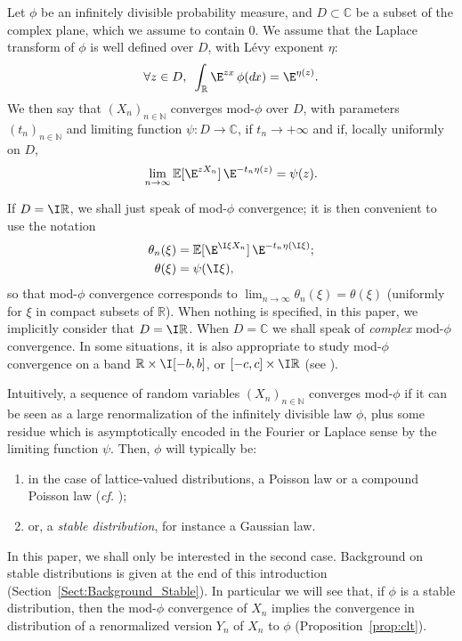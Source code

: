 \documentclass[envcountsame]{svmult}
\newcommand{\N}{\mathbb{N}}
\newcommand{\R}{\mathbb{R}}
\newcommand{\C}{\mathbb{C}}
\newcommand{\esper}{\mathbb{E}}
\newcommand{\DD}[1]{\,d\hspace*{-0.3mm}{#1}}
\begin{document}
\begin{definition}\label{def:modphi}
Let $\phi$ be an infinitely divisible probability measure, and $D \subset \C$ be a subset of the complex plane, which we assume to contain $0$. We assume that the Laplace transform of $\phi$ is well defined over $D$, with L\'evy exponent $\eta$:
$$\forall z \in D,\,\,\,\int_{\R} \E^{zx}\,\phi(\!\DD{x})=\E^{\eta(z)}.$$
We then say that $(X_n)_{n \in \N}$ converges mod-$\phi$ over $D$, with parameters $(t_n)_{n \in \N}$ and limiting function $\psi : D \to \C$, if $t_n \to + \infty$ and if, locally uniformly on $D$,
$$ \lim_{n \to \infty} \esper[\E^{zX_n}]\,\E^{-t_n\eta(z)} = \psi(z).$$
\end{definition}

\noindent If $D=\I \R$, we shall just speak of mod-$\phi$ convergence; it is then convenient to use the notation 
\begin{align*}
\theta_n(\xi)&=\esper[\E^{\I \xi X_n}]\,\E^{-t_n\eta(\I \xi)};\\
\theta(\xi)&= \psi(\I\xi),
\end{align*}
so that mod-$\phi$ convergence corresponds to $\lim_{n \to \infty}\theta_n(\xi)= \theta(\xi)$
(uniformly for $\xi$ in compact subsets of $\R$).
When nothing is specified, in this paper, we implicitly consider that $D=\I\R$.
When $D=\C$ we shall speak of \emph{complex} mod-$\phi$ convergence.
In some situations, it is also appropriate to study mod-$\phi$ convergence on a band $\R \times \I[-b,b]$, or $[-c,c] \times \I\R$ (see \cite{FMN16,MN15}).
\bigskip

Intuitively, a sequence of random variables $(X_n)_{n \in \N}$ converges mod-$\phi$ if it can be seen as a large renormalization of the infinitely divisible law $\phi$, plus some residue which is asymptotically encoded in the Fourier or Laplace sense by the limiting function $\psi$. Then, $\phi$ will typically be:
\begin{enumerate}
 	\item in the case of lattice-valued distributions, a Poisson law or a compound Poisson law (\emph{cf.} \cite{BKN09,KN10,FMN16,CDMN15});
 	\item or, a \emph{stable distribution}, for instance a Gaussian law.
 \end{enumerate} 
In this paper, we shall only be interested in the second case. Background on stable distributions is given at the end of this introduction (Section~\ref{Sect:Background_Stable}).
In particular we will see that, if $\phi$ is a stable distribution,
then the mod-$\phi$ convergence of $X_n$ implies
the convergence in distribution of a renormalized version $Y_n$ of $X_n$ to $\phi$
(Proposition~\ref{prop:clt}).\medskip
\end{document}
